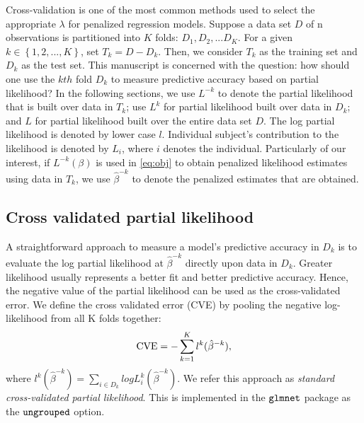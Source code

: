 \par Cross-validation is one of the most common methods used to select the appropriate $\lambda$ for penalized regression models. Suppose a data set $D$ of n observations is partitioned into $K$ folds: $D_{1}, D_{2}, ... D_{K}$. For a given $k \in \left\{1,2, ... , K\right\}$, set $T_{k} = D - D_{k}$. Then, we consider $T_{k}$ as the training set and $D_{k}$ as the test set. This manuscript is concerned with the question: how should one use the $kth$ fold $D_{k}$ to measure predictive accuracy based on partial likelihood? In the following sections, we use $L^{-k}$ to denote the partial likelihood that is built over data in $T_k$; use $L^{k}$ for partial likelihood built over data in $D_k$; and $L$ for partial likelihood built over the entire data set $D$.  The log partial likelihood is denoted by lower case $l$. Individual subject's contribution to the likelihood is denoted by $L_i$, where $i$ denotes the individual. Particularly of our interest, if $L^{-k}(\beta)$ is used in \eqref{eq:obj} to obtain penalized likelihood estimates using data in $T_k$, we use $\hat{\beta}^{-k}$ to denote the penalized estimates that are obtained. 

\subsection{Cross validated partial likelihood} 
\label{Sec:cox-cv-existing}
\par A straightforward approach to measure a model's predictive accuracy in $D_k$ is to evaluate the log partial likelihood at $\hat{\beta}^{-k}$ directly upon data in $D_k$. Greater likelihood usually represents a better fit and better predictive accuracy. Hence, the negative value of the partial likelihood can be used as the cross-validated error. We define the cross validated error (CVE) by pooling the negative log-likelihood from all K folds together:
\begin{equation}
  \label{eq:standard}
  \textrm{CVE} = - \sum_{k=1}^{K} l^{k}(\hat{\beta}^{-k}),
\end{equation}
where $l^{k}(\hat{\beta}^{-k}) = \sum \limits_{i \in D_{k}} log L^{k}_{i}(\hat{\beta}^{-k})$. We refer this approach as \emph{standard cross-validated partial likelihood}. This is implemented in the $\tt{glmnet}$ package as the $\tt{ungrouped}$ option.

